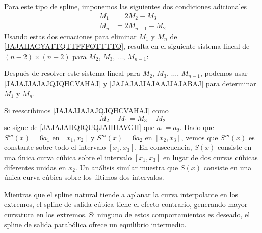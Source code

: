 Para este tipo de spline, imponemos las siguientes dos condiciones adicionales
\begin{align}
    M_1 & = 2M_2 - M_3 \label{JAJAJJAJAJQJQHCVAHAJ} \\
    M_n & = 2M_{n-1} - M_2 \label{JAJAJAJJAJAAJJAJABAJ}
\end{align}
Usando estas dos ecuaciones para eliminar $M_1$ y $M_n$ de \eqref{JAJAHAGYATTQTTFFFQTTTTQ}, resulta en el siguiente sistema lineal de $(n - 2) \times (n - 2)$ para $M_2$, $M_3$, $\dots$, $M_{n-1}$:
\begin{matrizn}
\end{matrizn}
Después de resolver este sistema lineal para $M_2$, $M_3$, $\dots$, $M_{n-1}$, podemos usar \eqref{JAJAJJAJAJQJQHCVAHAJ} y \eqref{JAJAJAJJAJAAJJAJABAJ} para determinar $M_1$ y $M_n$.

Si reescribimos \eqref{JAJAJJAJAJQJQHCVAHAJ} como
$$M_2 - M_1 = M_3 - M_2$$\newpage\noindent
se sigue de \eqref{JAJAJAIIQIQUQJAHHAVGH} que $a_1 = a_2$. Dado que $S'''(x) = 6a_1$ en $[x_1, x_2]$ y $S'''(x) = 6a_2$ en $[x_2, x_3]$, vemos que $S'''(x)$ es constante sobre todo el intervalo $[x_1, x_3]$. En consecuencia, $S(x)$ consiste en una única curva cúbica sobre el intervalo $[x_1, x_3]$ en lugar de dos curvas cúbicas diferentes unidas en $x_2$. Un análisis similar muestra que $S(x)$ consiste en una única curva cúbica sobre los últimos dos intervalos.

Mientras que el spline natural tiende a aplanar la curva interpolante en los extremos, el spline de salida cúbica tiene el efecto contrario, generando mayor curvatura en los extremos. Si ninguno de estos comportamientos es deseado, el spline de salida parabólica ofrece un equilibrio intermedio.

